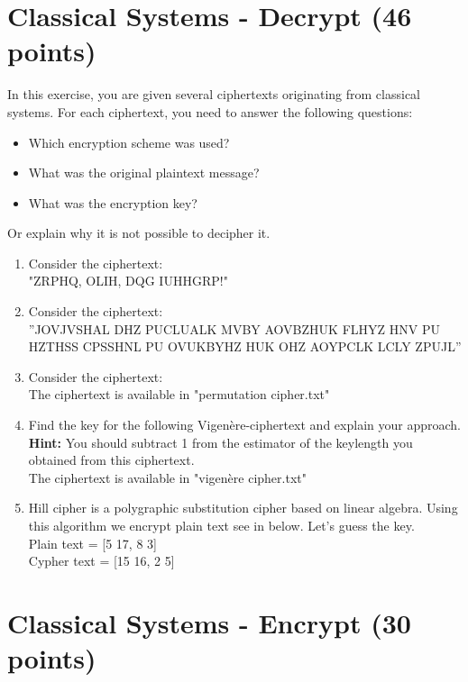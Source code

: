 \documentclass[12pt,oneside,oldfontcommands]{memoir}
\begin{document}
  \section*{Classical Systems - Decrypt (46 points)}
    In this exercise, you are given several ciphertexts originating from classical systems. For each ciphertext, you need to answer the following questions:
    \begin{itemize}
        \item Which encryption scheme was used?
        \item What was the original plaintext message?
        \item What was the encryption key?
    \end{itemize}
    Or explain why it is not possible to decipher it.
  \begin{enumerate}[label=(\alph*)]
    \item Consider the ciphertext:\\
        "ZRPHQ, OLIH, DQG IUHHGRP!"
    \item Consider the ciphertext:\\
        ”JOVJVSHAL DHZ PUCLUALK MVBY AOVBZHUK FLHYZ HNV PU HZTHSS CPSSHNL PU OVUKBYHZ HUK OHZ AOYPCLK LCLY ZPUJL”
    \item Consider the ciphertext:\\
        The ciphertext is available in "permutation cipher.txt"
    \item Find the key for the following Vigenère-ciphertext and explain your approach.\\
    \textbf{Hint: }You should subtract 1 from the estimator of the keylength you obtained from this ciphertext.\\
    The ciphertext is available in "vigenère cipher.txt"

    \item Hill cipher is a polygraphic substitution cipher based on linear algebra. Using this algorithm we encrypt plain text see in below. Let's guess the key.\\
    Plain text = [5 17, 8 3]\\
    Cypher text = [15 16, 2 5]
    
  \end{enumerate}
  \section*{Classical Systems - Encrypt (30 points)}
\end{document}
